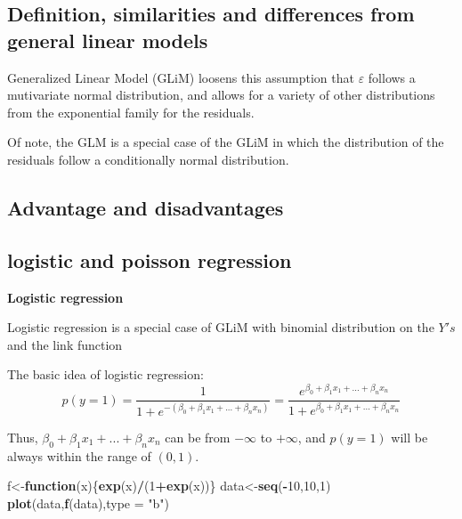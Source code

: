 \documentclass[]{book}
\newenvironment{Shaded}{\begin{snugshade}}{\end{snugshade}}
\newcommand{\ControlFlowTok}[1]{\textcolor[rgb]{0.13,0.29,0.53}{\textbf{#1}}}
\newcommand{\DataTypeTok}[1]{\textcolor[rgb]{0.13,0.29,0.53}{#1}}
\newcommand{\DecValTok}[1]{\textcolor[rgb]{0.00,0.00,0.81}{#1}}
\newcommand{\KeywordTok}[1]{\textcolor[rgb]{0.13,0.29,0.53}{\textbf{#1}}}
\newcommand{\NormalTok}[1]{#1}
\newcommand{\OperatorTok}[1]{\textcolor[rgb]{0.81,0.36,0.00}{\textbf{#1}}}
\newcommand{\StringTok}[1]{\textcolor[rgb]{0.31,0.60,0.02}{#1}}
\begin{document}
\hypertarget{definition-similarities-and-differences-from-general-linear-models}{%
\subsection{Definition, similarities and differences from general linear models}\label{definition-similarities-and-differences-from-general-linear-models}}

Generalized Linear Model (GLiM) loosens this assumption that \(\varepsilon\) follows a mutivariate normal distribution, and allows for a variety of other distributions from the exponential family for the residuals.

Of note, the GLM is a special case of the GLiM in which the distribution of the residuals follow a conditionally normal distribution.

\hypertarget{advantage-and-disadvantages}{%
\subsection{Advantage and disadvantages}\label{advantage-and-disadvantages}}

\hypertarget{logistic-and-poisson-regression}{%
\subsection{logistic and poisson regression}\label{logistic-and-poisson-regression}}

\textbf{Logistic regression}

Logistic regression is a special case of GLiM with binomial distribution on the \(Y's\) and the link function

The basic idea of logistic regression:
\[p(y=1)=\frac{1}{1+e^{-(\beta_0+\beta_1x_1+...+\beta_nx_n)}}=\frac{e^{\beta_0+\beta_1x_1+...+\beta_nx_n}}{1+e^{\beta_0+\beta_1x_1+...+\beta_nx_n}}\]

Thus, \(\beta_0+\beta_1x_1+...+\beta_nx_n\) can be from \(-\infty\) to \(+\infty\), and \(p(y=1)\) will be always within the range of \((0,1)\).

\begin{Shaded}
\begin{Highlighting}[]
\NormalTok{f<-}\ControlFlowTok{function}\NormalTok{(x)\{}\KeywordTok{exp}\NormalTok{(x)}\OperatorTok{/}\NormalTok{(}\DecValTok{1}\OperatorTok{+}\KeywordTok{exp}\NormalTok{(x))\}}
\NormalTok{data<-}\KeywordTok{seq}\NormalTok{(}\OperatorTok{-}\DecValTok{10}\NormalTok{,}\DecValTok{10}\NormalTok{,}\DecValTok{1}\NormalTok{)}
\KeywordTok{plot}\NormalTok{(data,}\KeywordTok{f}\NormalTok{(data),}\DataTypeTok{type =} \StringTok{"b"}\NormalTok{)}
\end{Highlighting}
\end{Shaded}
\end{document}
